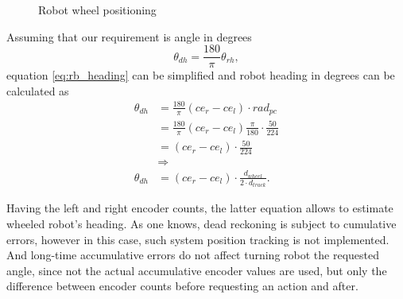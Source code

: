 \begin{figure}[!ht]
	\centering
	\caption{Robot wheel positioning}
	\label{fig:rb_wheel_graph}
\end{figure}
Assuming that our requirement is angle in degrees
$$
\theta_{dh} =  \frac{180}{\pi} \theta_{rh},   
$$
equation \ref{eq:rb_heading} can be simplified and robot heading in degrees can be calculated as
\begin{align*}
\theta_{dh} 
& = \frac{180}{\pi} (ce_{r} - ce_{l} ) \cdot rad_{pc} 								\\
& = \frac{180}{\pi} (ce_{r} - ce_{l} )   \frac{\pi}{180}\cdot \frac{ 50 }{ 224 } 	\\
& = (ce_{r} - ce_{l} ) \cdot \frac{ 50 }{ 224 } 									\\
& \Longrightarrow \\
\theta_{dh}
& = (ce_{r} - ce_{l} ) \cdot \frac{ d_{wheel} }{ 2\cdot d_{track} } .
\end{align*}

Having the left and right encoder counts, the latter equation allows to estimate wheeled robot's heading.
As one knows, dead reckoning is subject to cumulative errors, however in this case, such system position tracking is not implemented. And long-time accumulative errors do not affect turning robot the requested angle, since not the actual accumulative encoder values are used, but only the difference between encoder counts before requesting an action and after.

